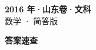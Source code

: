 \documentclass[zihao=-4, a4paper]{ctexart}
\begin{document}
\begin{center}
  {\Large\bfseries 2016 年·山东卷·文科}\\[4pt]
  {\large 数学 · 简答版}
\end{center}
\medskip
{}

\clearpage
{}
\begin{center}{\Large\bfseries 答案速查}\end{center}
\medskip

\end{document}
